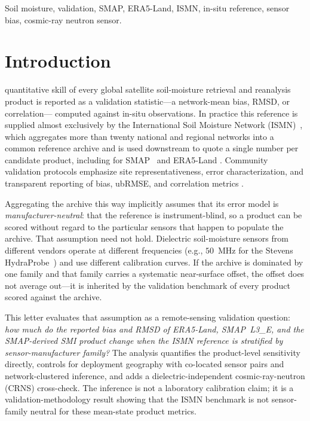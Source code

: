 \documentclass[journal]{IEEEtran}
\begin{document}
\begin{IEEEkeywords}
Soil moisture, validation, SMAP, ERA5-Land, ISMN, in-situ reference,
sensor bias, cosmic-ray neutron sensor.
\end{IEEEkeywords}

\IEEEpeerreviewmaketitle

\section{Introduction}
 quantitative skill of every global satellite
soil-moisture retrieval and reanalysis product is reported as a
validation statistic—a network-mean bias, RMSD, or correlation—
computed against in-situ observations. In practice this reference is
supplied almost exclusively by the International Soil Moisture Network
(ISMN)~\cite{Dorigo2021}, which aggregates more than twenty national
and regional networks into a common reference archive and is used
downstream to quote a single number per candidate product, including
for SMAP~\cite{ONeill2021,ChanSMAP2018} and ERA5-Land
\cite{MunozSabater2021}. Community validation protocols emphasize
site representativeness, error characterization, and transparent
reporting of bias, ubRMSE, and correlation metrics
\cite{Colliander2017,Gruber2020}.

Aggregating the archive this way implicitly assumes that its error
model is \emph{manufacturer-neutral}: that the reference is
instrument-blind, so a product can be scored without regard to the
particular sensors that happen to populate the archive. That
assumption need not hold. Dielectric soil-moisture sensors from
different vendors operate at different frequencies (e.g., $50$~MHz for
the Stevens HydraProbe~\cite{Seyfried2004}) and use different
calibration curves. If the archive is dominated by one family and that
family carries a systematic near-surface offset, the offset does not
average out—it is inherited by the validation benchmark of every
product scored against the archive.

This letter evaluates that assumption as a remote-sensing validation
question: \emph{how much do the reported bias and RMSD of ERA5-Land,
SMAP~L3\_E, and the SMAP-derived SMI product change when the ISMN
reference is stratified by sensor-manufacturer family?} The analysis
quantifies the product-level sensitivity directly, controls for
deployment geography with co-located sensor pairs and network-clustered
inference, and adds a dielectric-independent cosmic-ray-neutron (CRNS)
cross-check. The inference is not a laboratory calibration claim; it is
a validation-methodology result showing that the ISMN benchmark is not
sensor-family neutral for these mean-state product metrics.
\end{document}
